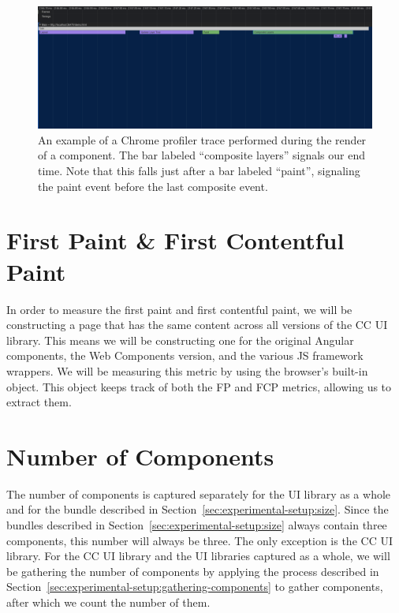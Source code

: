\begin{figure}[h]
  \includegraphics[width=\columnwidth]{figures/experimental-setup/render-time-zoomed.png}
  \caption{An example of a Chrome profiler trace performed during the render of a component. The bar labeled ``composite layers'' signals our end time. Note that this falls just after a bar labeled ``paint'', signaling the paint event before the last composite event.}
  \label{fig:experimental-setup:render-time-end}
  \centering
\end{figure}

\section{First Paint \& First Contentful Paint}
In order to measure the first paint and first contentful paint, we will be constructing a page that has the same content across all versions of the CC UI library. This means we will be constructing one for the original Angular components, the Web Components version, and the various JS framework wrappers. We will be measuring this metric by using the browser's built-in  object. This object keeps track of both the FP and FCP metrics, allowing us to extract them.

\section{Number of Components}
The number of components is captured separately for the UI library as a whole and for the bundle described in Section~\ref{sec:experimental-setup:size}. Since the bundles described in Section~\ref{sec:experimental-setup:size} always contain three components, this number will always be three. The only exception is the CC UI library. For the CC UI library and the UI libraries captured as a whole, we will be gathering the number of components by applying the process described in Section~\ref{sec:experimental-setup:gathering-components} to gather components, after which we count the number of them.
